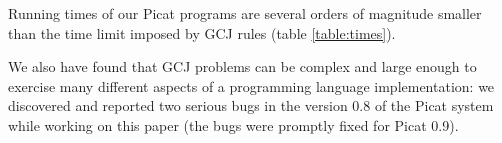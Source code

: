 \documentclass{llncs}
\begin{document}
Running times of our Picat programs are several orders of magnitude smaller than the time limit imposed by GCJ rules (table \ref{table:times}).

We also have found that GCJ problems can be complex and large enough to exercise many different aspects of a programming language implementation:
we discovered and reported two serious bugs in the version 0.8 of the Picat system while working on this paper (the bugs were promptly fixed for Picat 0.9).





\end{document}
